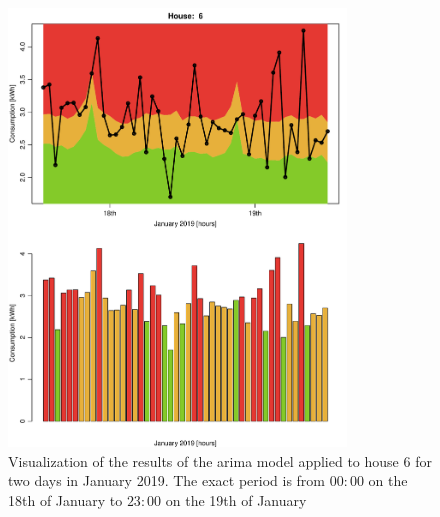 \begin{figure}
    \centering
    \includegraphics[width=0.8\textwidth]{../../../figures/AppHour6.pdf}
    \caption{Visualization of the results of the arima model applied to house 6 for two days in January 2019. The exact period is from $00:00$ on the 18th of January to $23:00$ on the 19th of January}
    \label{fig:app6}
\end{figure}






